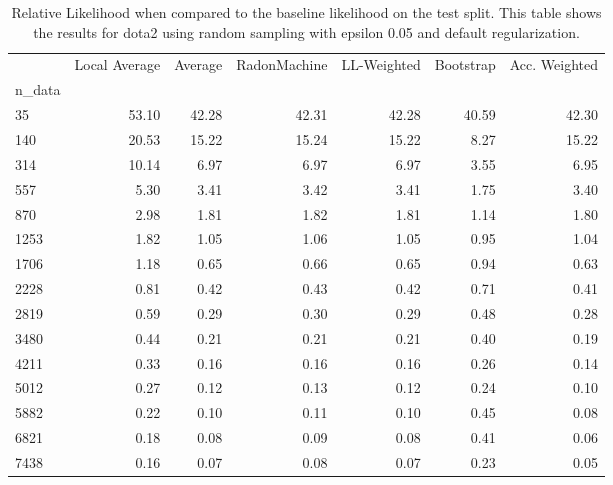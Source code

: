 \begin{table}
\centering
\caption{Relative Likelihood when compared to the baseline likelihood on the test split. This table shows the results for  dota2 using  random sampling with epsilon  0.05 and  default regularization.}
\label{tab:13}
\begin{tabular}{lrrrrrr}
\toprule
{} &  Local Average &  Average &  RadonMachine &  LL-Weighted &  Bootstrap &  Acc. Weighted \\
n\_data &                &          &               &              &            &                \\
\midrule
35     &          53.10 &    42.28 &         42.31 &        42.28 &      40.59 &          42.30 \\
140    &          20.53 &    15.22 &         15.24 &        15.22 &       8.27 &          15.22 \\
314    &          10.14 &     6.97 &          6.97 &         6.97 &       3.55 &           6.95 \\
557    &           5.30 &     3.41 &          3.42 &         3.41 &       1.75 &           3.40 \\
870    &           2.98 &     1.81 &          1.82 &         1.81 &       1.14 &           1.80 \\
1253   &           1.82 &     1.05 &          1.06 &         1.05 &       0.95 &           1.04 \\
1706   &           1.18 &     0.65 &          0.66 &         0.65 &       0.94 &           0.63 \\
2228   &           0.81 &     0.42 &          0.43 &         0.42 &       0.71 &           0.41 \\
2819   &           0.59 &     0.29 &          0.30 &         0.29 &       0.48 &           0.28 \\
3480   &           0.44 &     0.21 &          0.21 &         0.21 &       0.40 &           0.19 \\
4211   &           0.33 &     0.16 &          0.16 &         0.16 &       0.26 &           0.14 \\
5012   &           0.27 &     0.12 &          0.13 &         0.12 &       0.24 &           0.10 \\
5882   &           0.22 &     0.10 &          0.11 &         0.10 &       0.45 &           0.08 \\
6821   &           0.18 &     0.08 &          0.09 &         0.08 &       0.41 &           0.06 \\
7438   &           0.16 &     0.07 &          0.08 &         0.07 &       0.23 &           0.05 \\
\bottomrule
\end{tabular}
\end{table}
